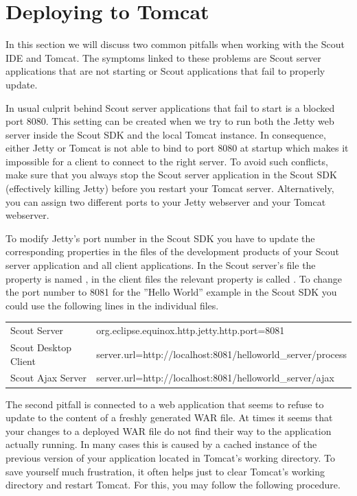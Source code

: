 \documentclass[a4paper,10pt,twoside]{book}
\begin{document}
\section{Deploying to Tomcat}

In this section we will discuss two common pitfalls when working with the Scout IDE and Tomcat.
The symptoms linked to these problems are Scout server applications that are not starting or Scout applications that fail to properly update.

In usual culprit behind Scout server applications that fail to start is a blocked port 8080.
This setting can be created when we try to run both the Jetty web server inside the Scout SDK and the local Tomcat instance.
In consequence, either Jetty or Tomcat is not able to bind to port 8080 at startup which makes it impossible for a client to connect to the right server.
To avoid such conflicts, make sure that you always stop the Scout server application in the Scout SDK (effectively killing Jetty) before you restart your Tomcat server.
Alternatively, you can assign two different ports to your Jetty webserver and your Tomcat webserver.

To modify Jetty's port number in the Scout SDK you have to update the corresponding properties in the  files of the development products of your Scout server application and all client applications.
In the Scout server's  file the property is named , in the client  files the relevant property is called .
To change the port number to 8081 for the ''Hello World'' example in the Scout SDK you could use the following lines in the individual  files.

\begin{tabular}{ll}
 Scout Server         & org.eclipse.equinox.http.jetty.http.port=8081              \\
 Scout Desktop Client & server.url=http://localhost:8081/helloworld\_server/process \\
 Scout Ajax Server    & server.url=http://localhost:8081/helloworld\_server/ajax
\end{tabular}

The second pitfall is connected to a web application that seems to refuse to update to the content of a freshly generated WAR file.
At times it seems that your changes to a deployed WAR file do not find their way to the application actually running. 
In many cases this is caused by a cached instance of the previous version of your application located in Tomcat's working directory.
To save yourself much frustration, it often helps just to clear Tomcat's working directory and restart Tomcat.
For this, you may follow the following procedure.
\end{document}
